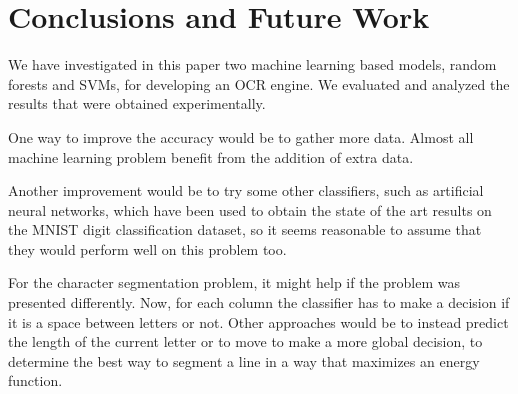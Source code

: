 \section{Conclusions and Future Work}
\label{ref:concl}
We have investigated in this paper two machine learning based models, random forests and SVMs, for developing an OCR engine. We evaluated and analyzed the results that were obtained experimentally. 

One way to improve the accuracy would be to gather more data. Almost all machine learning problem benefit from the addition of extra data\cite{halevy2009unreasonable}.

Another improvement would be to try some other classifiers, such as artificial neural networks, which have been used to obtain the state of the art results on the MNIST digit classification dataset, so it seems reasonable to assume that they would perform well on this problem too. 

For the character segmentation problem, it might help if the problem was presented differently. Now, for each column the classifier has to make a decision if it is a space between letters or not. Other approaches would be to instead predict the length of the current letter or to move to make a more global decision, to determine the best way to segment a line in a way that maximizes an energy function.